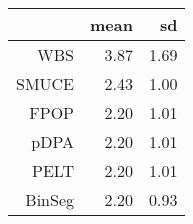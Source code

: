 \begin{tabular}{rrr}
  \hline
 & mean & sd \\ 
  \hline
WBS & 3.87 & 1.69 \\ 
  SMUCE & 2.43 & 1.00 \\ 
  FPOP & 2.20 & 1.01 \\ 
  pDPA & 2.20 & 1.01 \\ 
  PELT & 2.20 & 1.01 \\ 
  BinSeg & 2.20 & 0.93 \\ 
   \hline
\end{tabular}
